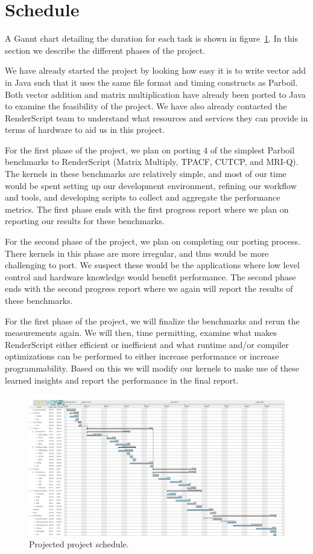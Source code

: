 
\section*{Schedule}

A Gannt chart detailing the duration for each task
  is shown in figure~\ref{fig:schedule}.
In this section we describe the different phases
    of the project.

We have already started the project by looking how
  easy it is to write vector add in Java such that
  it uses the same file format and timing constructs
  as Parboil.
Both vector addition and matrix multiplication have
  already been ported to Java to examine the feasibility
  of the project.
We have also already contacted the RenderScript team
  to understand what resources and services they can
  provide in terms of hardware to aid us in this project.

For the first phase of the project, we plan on porting
  4 of the simplest Parboil benchmarks to RenderScript
  (Matrix Multiply, TPACF, CUTCP, and MRI-Q).
The kernels in these benchmarks are relatively simple, 
  and most of our time would be spent setting up our 
  development environment, refining our workflow and tools, 
  and developing scripts to collect and aggregate the
  performance metrics.
The first phase ends with the first progress report where
    we plan on reporting our results for these benchmarks.


For the second phase of the project, we plan on completing
    our porting process.
There kernels in this phase are more irregular, and thus
    would be more challenging to port.
We suspect these would be the applications where low level
    control and hardware knowledge would benefit performance.
The second phase ends with the second progress report where
    we again will report the results of these benchmarks.


For the first phase of the project, we will finalize the 
    benchmarks and rerun the measurements again.
We will then, time permitting, examine what makes RenderScript
    either efficient or inefficient and what runtime and/or
    compiler optimizations can be performed to either 
    increase performance or increase programmability.
Based on this we will modify our kernels to make use of these
    learned insights and report the performance in the final
    report.

\begin{figure}[t!]
\includegraphics[scale=0.18, angle=90]{chart.png}
\caption{Projected project schedule.}
\label{fig:schedule}
\centering
\end{figure}
